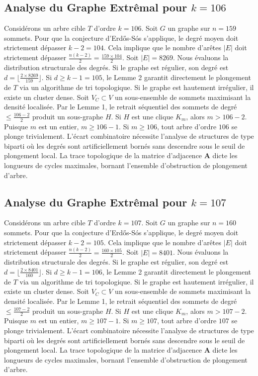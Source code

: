 \documentclass[11pt,a4paper]{article}
\begin{document}
\subsection{Analyse du Graphe Extr\^emal pour $k=106$}
Consid\'erons un arbre cible $T$ d'ordre $k=106$.
Soit $G$ un graphe sur $n=159$ sommets.
Pour que la conjecture d'Erd\H{o}s-S\'os s'applique, le degr\'e moyen doit strictement d\'epasser $k-2 = 104$.
Cela implique que le nombre d'ar\^etes $|E|$ doit strictement d\'epasser $\frac{n(k-2)}{2} = \frac{159 \times 104}{2}$.
Soit $|E| = 8269$.
Nous \'evaluons la distribution structurale des degr\'es. Si le graphe est r\'egulier, son degr\'e est $d = \lfloor \frac{2 \times 8269}{159} \rfloor$.
Si $d \geq k-1 = 105$, le Lemme 2 garantit directement le plongement de $T$ via un algorithme de tri topologique.
Si le graphe est hautement irr\'egulier, il existe un cluster dense. Soit $V_C \subset V$ un sous-ensemble de sommets maximisant la densit\'e localis\'ee.
Par le Lemme 1, le retrait s\'equentiel des sommets de degr\'e $\leq \frac{106-2}{2}$ produit un sous-graphe $H$.
Si $H$ est une clique $K_{m}$, alors $m > 106-2$. Puisque $m$ est un entier, $m \geq 106-1$. Si $m \geq 106$, tout arbre d'ordre $106$ se plonge trivialement.
L'\'ecart combinatoire n\'ecessite l'analyse de structures de type biparti o\`u les degr\'es sont artificiellement born\'es sans descendre sous le seuil de plongement local. La trace topologique de la matrice d'adjacence $\mathbf{A}$ dicte les longueurs de cycles maximales, bornant l'ensemble d'obstruction de plongement d'arbre.


\subsection{Analyse du Graphe Extr\^emal pour $k=107$}
Consid\'erons un arbre cible $T$ d'ordre $k=107$.
Soit $G$ un graphe sur $n=160$ sommets.
Pour que la conjecture d'Erd\H{o}s-S\'os s'applique, le degr\'e moyen doit strictement d\'epasser $k-2 = 105$.
Cela implique que le nombre d'ar\^etes $|E|$ doit strictement d\'epasser $\frac{n(k-2)}{2} = \frac{160 \times 105}{2}$.
Soit $|E| = 8401$.
Nous \'evaluons la distribution structurale des degr\'es. Si le graphe est r\'egulier, son degr\'e est $d = \lfloor \frac{2 \times 8401}{160} \rfloor$.
Si $d \geq k-1 = 106$, le Lemme 2 garantit directement le plongement de $T$ via un algorithme de tri topologique.
Si le graphe est hautement irr\'egulier, il existe un cluster dense. Soit $V_C \subset V$ un sous-ensemble de sommets maximisant la densit\'e localis\'ee.
Par le Lemme 1, le retrait s\'equentiel des sommets de degr\'e $\leq \frac{107-2}{2}$ produit un sous-graphe $H$.
Si $H$ est une clique $K_{m}$, alors $m > 107-2$. Puisque $m$ est un entier, $m \geq 107-1$. Si $m \geq 107$, tout arbre d'ordre $107$ se plonge trivialement.
L'\'ecart combinatoire n\'ecessite l'analyse de structures de type biparti o\`u les degr\'es sont artificiellement born\'es sans descendre sous le seuil de plongement local. La trace topologique de la matrice d'adjacence $\mathbf{A}$ dicte les longueurs de cycles maximales, bornant l'ensemble d'obstruction de plongement d'arbre.
\end{document}
